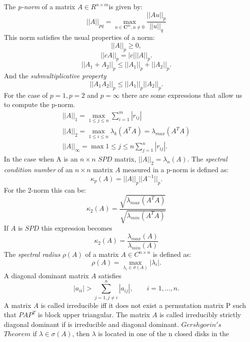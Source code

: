 \documentclass[a4paper,10pt]{report}
\begin{document}
The \emph{p-norm} of a matrix $A\in R^{n\times m}$is given by:
$$||A||_{pq}=\max_{u\in\mathbf{C}^m,u\neq 0}\frac{||Au||_p}{||u||_q}$$
This norm satisfies the usual properties of a norm:
 \begin{equation*}
  ||A||_p \geq 0 ,
 \end{equation*}
 \begin{equation*}
  ||cA||_p=|c|||A||_p.
 \end{equation*}
  \begin{equation*}
  ||A_1+A_2||_p \leq ||A_1||_p +||A_2||_p.
 \end{equation*}
 And the \emph{submultiplicative property}
  \begin{equation*}
  ||A_1A_2||_p \leq ||A_1||_p ||A_2||_p.
 \end{equation*}
 For the case of $p=1,p=2$ and $p=\infty$ there are some expressions that allow us to
 compute the p-norm.
\begin{gather*}
||A||_1=\max_{1\leq j\leq n}\sum_{i=1}^m |r_{ij}| \\
||A||_2=\max_{1\leq i\leq n} \lambda_k (A^TA)=\lambda_{max}(A^TA) \\
||A||_{\infty}=\max{1\leq j\leq n}\sum_{j=1}^n |r_{ij}|.
\end{gather*}
In the case when A is an $n\times n$ $SPD$ matrix, $||A||_2=\lambda_n(A)$. 
 The \emph{spectral condition number} of an $n\times n$ matrix $A$ measured in a p-norm is defined as:
 $$\kappa_p(A)=||A||_p||A^{-1}||_p.$$
 For the 2-norm this can be:
 \begin{equation*}
 \kappa_2(A)=\frac{\sqrt{\lambda_{max}(A^TA)}}{\sqrt{\lambda_{min}(A^TA)}} 
 \end{equation*}
If $A$ is $SPD$ this expression becomes
 \begin{equation*}
 \kappa_2(A)=\frac{\lambda_{max}(A)}{\lambda_{min}(A)} 
 \end{equation*}
The \emph{spectral radius} $\rho(A)$ of a matrix $A \in C^{n\times n}$ is defined as:
$$\rho(A)=\max_{\lambda_i \in \sigma(A)}|\lambda_i|.$$
A diagonal dominant matrix $A$ satisfies 
\begin{equation*}
 |a_{ii}|>\sum_{j=1,j\neq i}^n|a_{ij}|, \qquad i=1,...,n.
\end{equation*}
A matrix $A$ is called irreducible iff it does not exist a permutation matrix P such that
$PAP^T$ is block upper triangular.
The matrix $A$ is called irreducibly strictly diagonal dominant if is irreducible and diagonal dominant.
$Gershgorin's$ $Theorem$ if $\lambda \in \sigma (A)$, then $\lambda$ is located in one of the n closed disks in the 
\end{document}
